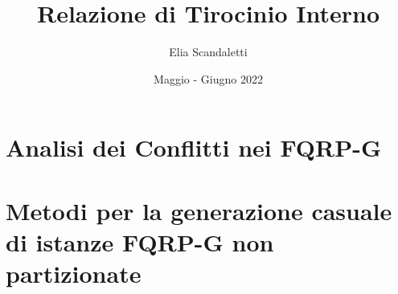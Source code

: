 \documentclass{article}
\title{Relazione di Tirocinio Interno}
\author{Elia Scandaletti}
\date{Maggio - Giugno 2022}
\theoremstyle{definition}
\begin{document}
\maketitle
\tableofcontents

\section{Analisi dei Conflitti nei FQRP-G}


\section{Metodi per la generazione casuale di istanze FQRP-G non partizionate}

\end{document}
